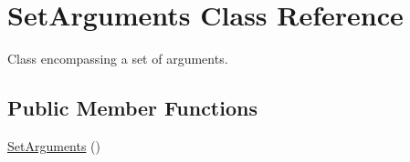 \hypertarget{classSetArguments}{\section{Set\-Arguments Class Reference}
\label{classSetArguments}
}


Class encompassing a set of arguments.  


\subsection*{Public Member Functions}
\begin{DoxyCompactItemize}
\item 
\hypertarget{classSetArguments_acbba23977f0c9fc09a827b0b1c9df7a3}{\hyperlink{classSetArguments_acbba23977f0c9fc09a827b0b1c9df7a3}{Set\-Arguments} ()}\label{classSetArguments_acbba23977f0c9fc09a827b0b1c9df7a3}


\end{DoxyCompactItemize}
